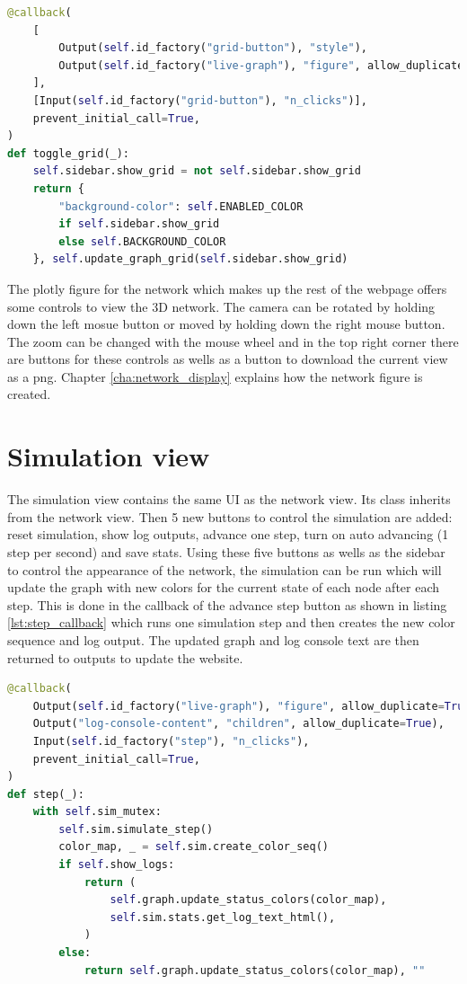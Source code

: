 \begin{lstlisting}[language=python, caption={Callback for toggling the grid}, label={lst:grid_callback}]
@callback(
    [
        Output(self.id_factory("grid-button"), "style"),
        Output(self.id_factory("live-graph"), "figure", allow_duplicate=True),
    ],
    [Input(self.id_factory("grid-button"), "n_clicks")],
    prevent_initial_call=True,
)
def toggle_grid(_):
    self.sidebar.show_grid = not self.sidebar.show_grid
    return {
        "background-color": self.ENABLED_COLOR
        if self.sidebar.show_grid
        else self.BACKGROUND_COLOR
    }, self.update_graph_grid(self.sidebar.show_grid)
\end{lstlisting}

The plotly figure for the network which makes up the rest of the webpage offers some controls
to view the 3D network. The camera can be rotated by holding down the left mosue button
or moved by holding down the right mouse button. The zoom can be changed with the mouse wheel
and in the top right corner there are buttons for these controls as wells as a button to download
the current view as a png. Chapter \ref{cha:network_display} explains how the network figure
is created.

\section{Simulation view}
The simulation view contains the same UI as the network view. Its class inherits from the
network view. Then 5 new buttons to control the simulation are added: reset simulation,
show log outputs, advance one step, turn on auto advancing (1 step per second) and 
save stats. Using these five buttons as wells as the sidebar to control the appearance
of the network, the simulation can be run which will update the graph with new colors
for the current state of each node after each step. This is done in the callback of the
advance step button as shown in listing \ref{lst:step_callback} which runs one simulation
step and then creates the new color sequence and log output. The updated graph and log console
text are then returned to outputs to update the website.

\begin{lstlisting}[language=python, caption={Callback for advancing simulaton by one step}, label={lst:step_callback}]
@callback(
    Output(self.id_factory("live-graph"), "figure", allow_duplicate=True),
    Output("log-console-content", "children", allow_duplicate=True),
    Input(self.id_factory("step"), "n_clicks"),
    prevent_initial_call=True,
)
def step(_):
    with self.sim_mutex:
        self.sim.simulate_step()
        color_map, _ = self.sim.create_color_seq()
        if self.show_logs:
            return (
                self.graph.update_status_colors(color_map),
                self.sim.stats.get_log_text_html(),
            )
        else:
            return self.graph.update_status_colors(color_map), ""
\end{lstlisting}

